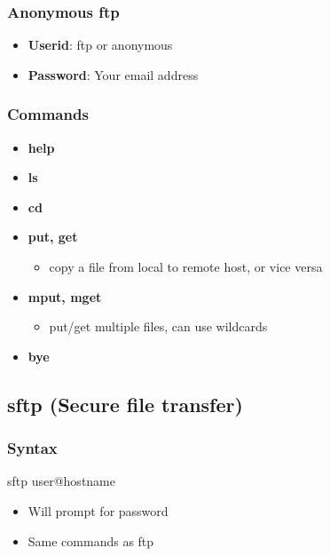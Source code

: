 \documentclass{report}
\begin{document}
    \bigbreak \noindent 
    \subsubsection{Anonymous ftp}
    \bigbreak \noindent 
    \begin{itemize}
        \item \textbf{Userid}: ftp or anonymous
        \item \textbf{Password}: Your email address
    \end{itemize}

    \bigbreak \noindent 
    \subsubsection{Commands}
    \bigbreak \noindent 
    \begin{itemize}
        \item \textbf{help}
        \item \textbf{ls}
        \item \textbf{cd} 
        \item \textbf{put, get}
            \begin{itemize}
                \item copy a file from local to remote host, or vice versa 
            \end{itemize}
        \item \textbf{mput, mget}
            \begin{itemize}
                \item put/get multiple files, can use wildcards
            \end{itemize}
        \item \textbf{bye}
    \end{itemize}

    \pagebreak 
    \subsection{sftp (Secure file transfer)}

    \bigbreak \noindent 
    \subsubsection{Syntax}
    \bigbreak \noindent 
    \begin{bashcode}
    sftp user@hostname
    \end{bashcode}
    \bigbreak \noindent 
    \begin{itemize}
        \item Will prompt for password
        \item Same commands as ftp
    \end{itemize}
\end{document}
